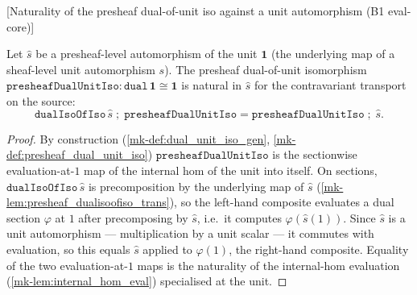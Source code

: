 \begin{lemma}


[Naturality of the presheaf dual-of-unit iso against a unit automorphism (B1 eval-core)]
  \label{mk-lem:presheafdualunitiso_naturality}
  \lean{}

  Let \(\hat s\) be a presheaf-level automorphism of the unit \(\mathbf 1\) (the underlying map of a
  sheaf-level unit automorphism \(s\)). The presheaf dual-of-unit isomorphism
  \(\mathtt{presheafDualUnitIso} : \mathtt{dual}\,\mathbf 1 \cong \mathbf 1\) is natural in
  \(\hat s\) for the contravariant transport on the source:
  \[
    \mathtt{dualIsoOfIso}\,\hat s \;\mathbin{;}\; \mathtt{presheafDualUnitIso}
      = \mathtt{presheafDualUnitIso} \;\mathbin{;}\; \hat s.
  \]
\end{lemma}
\begin{proof}
  By construction (\ref{mk-def:dual_unit_iso_gen}, \ref{mk-def:presheaf_dual_unit_iso})
  \(\mathtt{presheafDualUnitIso}\) is the sectionwise evaluation-at-\(1\) map of the internal hom of
  the unit into itself. On sections, \(\mathtt{dualIsoOfIso}\,\hat s\) is precomposition by the
  underlying map of \(\hat s\) (\ref{mk-lem:presheaf_dualisoofiso_trans}), so the left-hand composite
  evaluates a dual section \(\varphi\) at \(1\) after precomposing by \(\hat s\), i.e.\ it computes
  \(\varphi(\hat s(1))\). Since \(\hat s\) is a unit automorphism --- multiplication by a unit scalar
  --- it commutes with evaluation, so this equals \(\hat s\) applied to \(\varphi(1)\), the
  right-hand composite. Equality of the two evaluation-at-\(1\) maps is the naturality of the
  internal-hom evaluation (\ref{mk-lem:internal_hom_eval}) specialised at the unit.
\end{proof}

